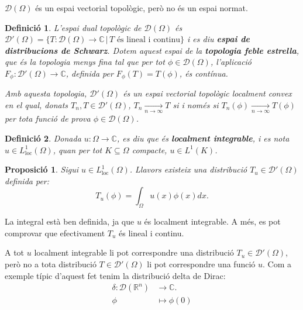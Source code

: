 \documentclass{article}
\numberwithin{equation}{section}
\newtheorem{definicio}{Definici\'{o}}[section]
\newtheorem{proposicio}{Proposici\'{o}}[section]
\begin{document}
$\mathcal{D}(\Omega)$ \'{e}s un espai vectorial topol\`{o}gic, per\`{o} no \'{e}s un espai normat.

\begin{definicio}\label{Def: distribucio Schwarz}
L'espai dual topol\`{o}gic de $\mathcal{D}(\Omega)$ \'{e}s $\mathcal{D}'(\Omega)=\{T:\mathcal{D}(\Omega)\rightarrow\mathbb{C}\,|\,T\text{ \'{e}s lineal i continu}\}$ i es diu \textbf{espai de distribucions de Schwarz}. Dotem aquest espai de la \textbf{topologia feble estrella}, que \'{e}s la topologia menys fina tal que per tot $\phi\in\mathcal{D}(\Omega)$, l'aplicaci\'{o} $F_{\phi}:\mathcal{D}'(\Omega)\rightarrow\mathbb{C}$, definida per $F_{\phi}(T)=T(\phi)$, \'{e}s cont\'{i}nua.

Amb aquesta topologia, $\mathcal{D}'(\Omega)$ \'{e}s un espai vectorial topol\`{o}gic localment convex en el qual, donats $T_n,T\in\mathcal{D}'(\Omega)$, $T_n\xrightarrow[n\to\infty]{}T$ si i nom\'{e}s si $T_n(\phi)\xrightarrow[n\to\infty]{}T(\phi)$ per tota funci\'{o} de prova $\phi\in\mathcal{D}(\Omega)$.
\end{definicio}

\begin{definicio}
Donada $u:\Omega\rightarrow\mathbb{C}$, es diu que \'{e}s \textbf{localment integrable}, i es nota $u\in L_{\text{loc}}^1(\Omega)$, quan per tot $K\subseteq\Omega$ compacte, $u\in L^1(K)$.
\end{definicio}

\begin{proposicio}\label{Pro: distribucio funcio}
Sigui $u\in L_{\text{loc}}^1(\Omega)$. Llavors existeix una distribuci\'{o} $T_u\in\mathcal{D}'(\Omega)$ definida per:
\[T_u(\phi)=\int_{\Omega}u(x)\phi(x)dx.\]
\end{proposicio}

La integral est\`{a} ben definida, ja que $u$ \'{e}s localment integrable. A m\'{e}s, es pot comprovar que efectivament $T_u$ \'{e}s lineal i continu.

A tot $u$ localment integrable li pot correspondre una distribuci\'{o} $T_u\in\mathcal{D}'(\Omega)$, per\`{o} no a tota distribuci\'{o} $T\in\mathcal{D}'(\Omega)$ li pot correspondre una funci\'{o} $u$. Com a exemple t\'{i}pic d'aquest fet tenim la distribuci\'{o} delta de Dirac:
\[
\begin{split}
\delta:\mathcal{D}(\mathbb{R}^n)&\longrightarrow\mathbb{C}.\\
\phi&\longmapsto\phi(0)
\end{split}
\]
\end{document}

